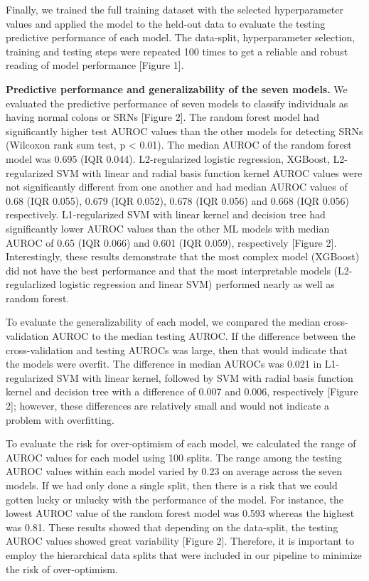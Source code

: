 \documentclass[11pt,]{article}
\begin{document}
Finally, we trained the full training dataset with the selected
hyperparameter values and applied the model to the held-out data to
evaluate the testing predictive performance of each model. The
data-split, hyperparameter selection, training and testing steps were
repeated 100 times to get a reliable and robust reading of model
performance {[}Figure 1{]}.

\textbf{Predictive performance and generalizability of the seven
models.} We evaluated the predictive performance of seven models to
classify individuals as having normal colons or SRNs {[}Figure 2{]}. The
random forest model had significantly higher test AUROC values than the
other models for detecting SRNs (Wilcoxon rank sum test, p \textless{}
0.01). The median AUROC of the random forest model was 0.695 (IQR
0.044). L2-regularized logistic regression, XGBoost, L2-regularized SVM
with linear and radial basis function kernel AUROC values were not
significantly different from one another and had median AUROC values of
0.68 (IQR 0.055), 0.679 (IQR 0.052), 0.678 (IQR 0.056) and 0.668 (IQR
0.056) respectively. L1-regularized SVM with linear kernel and decision
tree had significantly lower AUROC values than the other ML models with
median AUROC of 0.65 (IQR 0.066) and 0.601 (IQR 0.059), respectively
{[}Figure 2{]}. Interestingly, these results demonstrate that the most
complex model (XGBoost) did not have the best performance and that the
most interpretable models (L2-regularlized logistic regression and
linear SVM) performed nearly as well as random forest.

To evaluate the generalizability of each model, we compared the median
cross-validation AUROC to the median testing AUROC. If the difference
between the cross-validation and testing AUROCs was large, then that
would indicate that the models were overfit. The difference in median
AUROCs was 0.021 in L1-regularized SVM with linear kernel, followed by
SVM with radial basis function kernel and decision tree with a
difference of 0.007 and 0.006, respectively {[}Figure 2{]}; however,
these differences are relatively small and would not indicate a problem
with overfitting.

To evaluate the risk for over-optimism of each model, we calculated the
range of AUROC values for each model using 100 splits. The range among
the testing AUROC values within each model varied by 0.23 on average
across the seven models. If we had only done a single split, then there
is a risk that we could gotten lucky or unlucky with the performance of
the model. For instance, the lowest AUROC value of the random forest
model was 0.593 whereas the highest was 0.81. These results showed that
depending on the data-split, the testing AUROC values showed great
variability {[}Figure 2{]}. Therefore, it is important to employ the
hierarchical data splits that were included in our pipeline to minimize
the risk of over-optimism.
\end{document}
